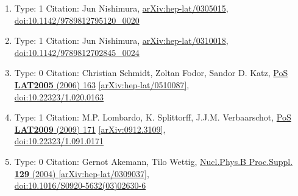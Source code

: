 \documentclass[a4paper,10pt]{article}
\begin{document}
\begin{enumerate}
\begin{enumerate}
  \item Type: 1 Citation: Jun Nishimura, \href{https://arxiv.org/abs/hep-lat/0305015}{arXiv:hep-lat/0305015},\\\href{https://www.doi.org/10.1142/9789812795120_0020}{doi:10.1142/9789812795120\_0020}
  \item Type: 1 Citation: Jun Nishimura, \href{https://arxiv.org/abs/hep-lat/0310018}{arXiv:hep-lat/0310018},\\\href{https://www.doi.org/10.1142/9789812702845_0024}{doi:10.1142/9789812702845\_0024}
  \item Type: 0 Citation: Christian Schmidt, Zoltan Fodor, Sandor D. Katz, \href{https://www.doi.org/10.22323/1.020.0163}{PoS {\bf LAT2005} (2006) 163}  \href{https://arxiv.org/abs/hep-lat/0510087}{[arXiv:hep-lat/0510087]},\\\href{https://www.doi.org/10.22323/1.020.0163}{doi:10.22323/1.020.0163}
  \item Type: 1 Citation: M.P. Lombardo, K. Splittorff, J.J.M. Verbaarschot, \href{https://www.doi.org/10.22323/1.091.0171}{PoS {\bf LAT2009} (2009) 171}  \href{https://arxiv.org/abs/0912.3109}{[arXiv:0912.3109]},\\\href{https://www.doi.org/10.22323/1.091.0171}{doi:10.22323/1.091.0171}
  \item Type: 0 Citation: Gernot Akemann, Tilo Wettig, \href{https://www.doi.org/10.1016/S0920-5632(03)02630-6}{Nucl.Phys.B Proc.Suppl. {\bf 129} (2004) }  \href{https://arxiv.org/abs/hep-lat/0309037}{[arXiv:hep-lat/0309037]},\\\href{https://www.doi.org/10.1016/S0920-5632(03)02630-6}{doi:10.1016/S0920-5632(03)02630-6}

\end{enumerate}
\end{enumerate}
\end{document}
